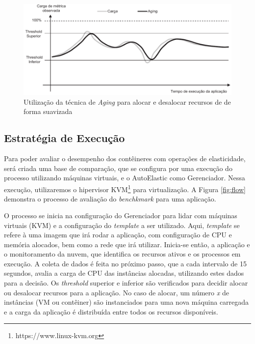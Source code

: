 \documentclass[twoside,english,brazilian]{UNISINOSartigo}
\begin{document}
\begin{figure}
	\caption{Utilização da técnica de \textit{Aging} para alocar e desalocar recursos de de forma suavizada}
	\label{fig:aging}
	\centering%
	\vspace{-0.75\baselineskip}
	\begin{minipage}{0.75\textwidth}
		\includegraphics[width=\textwidth]{images/aging}
	\end{minipage}
\end{figure}

\subsection{Estratégia de Execução}

Para poder avaliar o desempenho dos contêineres com operações de elasticidade, será criada uma base de comparação, que se configura por uma execução do processo utilizando máquinas virtuais, e o AutoElastic como Gerenciador. Nessa execução, utilizaremos o hipervisor KVM\footnote{https://www.linux-kvm.org} para virtualização. A Figura \ref{fig:flow} demonstra o processo de avaliação do \textit{benchkmark} para uma aplicação.

O processo se inicia na configuração do Gerenciador para lidar com máquinas virtuais (KVM) e a configuração do \textit{template} a ser utilizado. Aqui, \textit{template} se refere à uma imagem que irá rodar a aplicação, com configuração de CPU e memória alocados, bem como a rede que irá utilizar. Inicia-se então, a aplicação e o monitoramento da nuvem, que identifica os recursos ativos e os processos em execução. A coleta de dados é feita no próximo passo, que a cada intervalo de 15 segundos, avalia a carga de CPU das instâncias alocadas, utilizando estes dados para a decisão. Os \textit{threshold} superior e inferior são verificados para decidir alocar ou desalocar recursos para a aplicação. No caso de alocar, um número \textit{x} de instâncias (VM ou contêiner) são instanciados para uma nova máquina carregada e a carga da aplicação é distribuída entre todos os recursos disponíveis.
\end{document}
